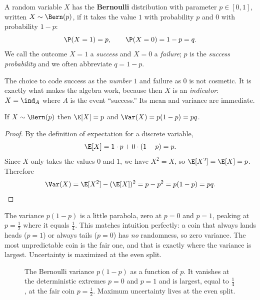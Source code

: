 \begin{definition}
\label{ch07:def-bernoulli}
A random variable $X$ has the \textbf{Bernoulli} distribution with parameter
$p \in [0,1]$, written $X \sim \Bern(p)$, if it takes the value $1$ with
probability $p$ and $0$ with probability $1-p$:
\[
  \P(X = 1) = p, \qquad \P(X = 0) = 1 - p = q.
\]
We call the outcome $X=1$ a \emph{success} and $X=0$ a \emph{failure}; $p$ is the
\emph{success probability} and we often abbreviate $q = 1-p$.
\end{definition}

The choice to code success as the \emph{number} $1$ and failure as $0$ is not
cosmetic. It is exactly what makes the algebra work, because then $X$ is an
\emph{indicator}: $X = \ind_A$ where $A$ is the event ``success.'' Its mean and
variance are immediate.

\begin{proposition}
\label{ch07:bern-moments}
If $X \sim \Bern(p)$ then $\E[X] = p$ and $\Var(X) = p(1-p) = pq$.
\end{proposition}

\begin{proof}
By the definition of expectation for a discrete variable,
\[
  \E[X] = 1 \cdot p + 0 \cdot (1-p) = p.
\]
Since $X$ only takes the values $0$ and $1$, we have $X^2 = X$, so
$\E[X^2] = \E[X] = p$. Therefore
\[
  \Var(X) = \E[X^2] - (\E[X])^2 = p - p^2 = p(1-p) = pq. \qedhere
\]
\end{proof}

\begin{intuitionbox}
The variance $p(1-p)$ is a little parabola, zero at $p=0$ and $p=1$, peaking at
$p = \tfrac12$ where it equals $\tfrac14$. This matches intuition perfectly: a
coin that always lands heads ($p=1$) or always tails ($p=0$) has \emph{no}
randomness, so zero variance. The most unpredictable coin is the fair one, and
that is exactly where the variance is largest. Uncertainty is maximized at the
even split.
\end{intuitionbox}

\begin{figure}[H]
\centering
{}
\caption{The Bernoulli variance $p(1-p)$ as a function of $p$. It vanishes at the
deterministic extremes $p=0$ and $p=1$ and is largest, equal to $\tfrac14$, at the
fair coin $p=\tfrac12$. Maximum uncertainty lives at the even split.}
\label{ch07:fig-bern-var}
\end{figure}

